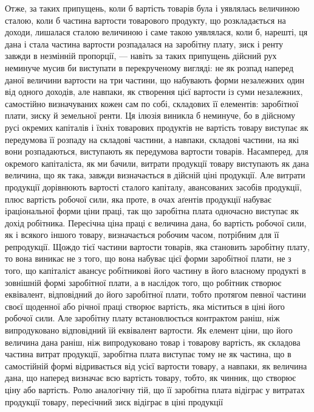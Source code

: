 Отже, за таких припущень, коли б вартість товарів була і уявлялась величиною
сталою, коли б частина вартости товарового продукту, що розкладається
на доходи, лишалася сталою величиною і саме такою уявлялася, коли б, нарешті,
ця дана і стала частина вартости розпадалася на заробітну плату, зиск і ренту
завжди в незмінній пропорції, — навіть за таких припущень дійсний рух неминуче
мусив би виступати в перекрученому вигляді: не як розпад наперед даної
величини вартости на три частини, що набувають форми незалежних один від
одного доходів, але навпаки, як створення цієї вартости із суми незалежних,
самостійно визначуваних кожен сам по собі, складових її елементів: заробітної
плати, зиску й земельної ренти. Ця ілюзія виникла б неминуче, бо в дійсному
русі окремих капіталів і їхніх товарових продуктів не вартість товару виступає
як передумова її розпаду на складові частини, а навпаки, складові частини, на які
вони розпадаються, виступають як передумова вартости товарів. Насамперед, для
окремого капіталіста, як ми бачили, витрати продукції товару виступають
як дана величина, що як така, завжди визначається в дійсній ціні продукції.
Але витрати продукції дорівнюють вартості сталого капіталу, авансованих засобів
продукції, плюс вартість робочої сили, яка проте, в очах аґентів продукції набуває
іраціональної форми ціни праці, так що заробітна плата одночасно виступає
як дохід робітника. Пересічна ціна праці є величина дана, бо вартість робочої
сили, як і всякого іншого товару, визначається робочим часом, потрібним
для її репродукції. Щождо тієї частини вартости товарів, яка становить заробітну
плату, то вона виникає не з того, що вона набуває цієї форми заробітної плати,
не з того, що капіталіст авансує робітникові його частину в його власному
продукті в зовнішній формі заробітної плати, а в наслідок того, що робітник
створює еквівалент, відповідний до його заробітної плати, тобто протягом певної
частини своєї щоденної або річної праці створює вартість, яка міститься в ціні
його робочої сили. Але заробітну плату встановлюється контрактом раніш, ніж
випродуковано відповідний їй еквівалент вартости. Як елемент ціни, що його
величина дана раніш, ніж випродуковано товар і товарову вартість, як складова
частина витрат продукції, заробітна плата виступає тому не як частина,
що в самостійній формі відривається від усієї вартости товару, а навпаки, як
величина дана, що наперед визначає всю вартість товару, тобто, як чинник,
що створює ціну або вартість. Ролю аналогічну тій, що її заробітна плата
відіграє у витратах продукції товару, пересічний зиск відіграє в ціні продукції

